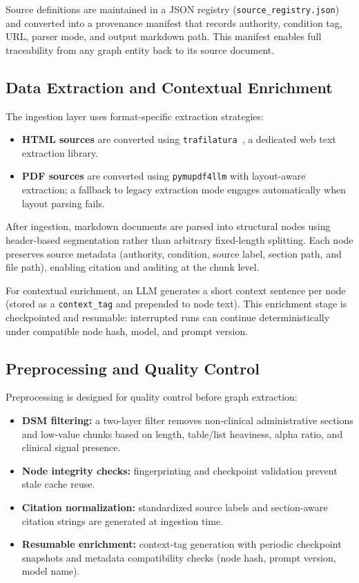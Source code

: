 \documentclass[12pt,a4paper]{article}
\begin{document}
Source definitions are maintained in a JSON registry (\texttt{source\_registry.json}) and converted into a provenance manifest that records authority, condition tag, URL, parser mode, and output markdown path. This manifest enables full traceability from any graph entity back to its source document.

\subsection{Data Extraction and Contextual Enrichment}

The ingestion layer uses format-specific extraction strategies:
\begin{itemize}[nosep]
    \item \textbf{HTML sources} are converted using \texttt{trafilatura}~\cite{barbaresi2021trafilatura}, a dedicated web text extraction library.
    \item \textbf{PDF sources} are converted using \texttt{pymupdf4llm} with layout-aware extraction; a fallback to legacy extraction mode engages automatically when layout parsing fails.
\end{itemize}

After ingestion, markdown documents are parsed into structural nodes using header-based segmentation rather than arbitrary fixed-length splitting. Each node preserves source metadata (authority, condition, source label, section path, and file path), enabling citation and auditing at the chunk level.

For contextual enrichment, an LLM generates a short context sentence per node (stored as a \texttt{context\_tag} and prepended to node text). This enrichment stage is checkpointed and resumable: interrupted runs can continue deterministically under compatible node hash, model, and prompt version.

\subsection{Preprocessing and Quality Control}

Preprocessing is designed for quality control before graph extraction:
\begin{itemize}[nosep]
    \item \textbf{DSM filtering:} a two-layer filter removes non-clinical administrative sections and low-value chunks based on length, table/list heaviness, alpha ratio, and clinical signal presence.
    \item \textbf{Node integrity checks:} fingerprinting and checkpoint validation prevent stale cache reuse.
    \item \textbf{Citation normalization:} standardized source labels and section-aware citation strings are generated at ingestion time.
    \item \textbf{Resumable enrichment:} context-tag generation with periodic checkpoint snapshots and metadata compatibility checks (node hash, prompt version, model name).
\end{itemize}
\end{document}
